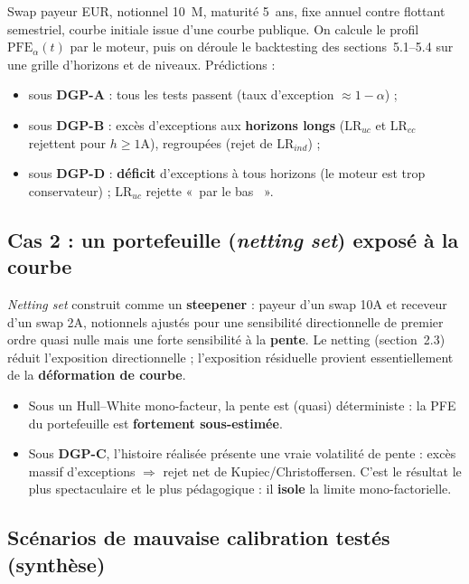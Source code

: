 \documentclass[11pt,a4paper]{article}
\providecommand{\euro}{\texteuro}
\providecommand{\og}{«~}
\providecommand{\fg}{~»}
\newcommand{\PFE}{\mathrm{PFE}}
\newcommand{\LRuc}{\mathrm{LR}_{uc}}
\newcommand{\LRind}{\mathrm{LR}_{ind}}
\newcommand{\LRcc}{\mathrm{LR}_{cc}}
\theoremstyle{remark}
\begin{document}
Swap payeur EUR, notionnel 10~M\euro, maturité 5~ans, fixe annuel contre flottant semestriel, courbe initiale issue d'une courbe publique. On calcule le profil $\PFE_\alpha(t)$ par le moteur, puis on déroule le backtesting des sections~5.1--5.4 sur une grille d'horizons et de niveaux. Prédictions :
\begin{itemize}[nosep]
  \item sous \textbf{DGP-A} : tous les tests passent (taux d'exception $\approx 1-\alpha$) ;
  \item sous \textbf{DGP-B} : excès d'exceptions aux \textbf{horizons longs} ($\LRuc$ et $\LRcc$ rejettent pour $h\ge 1\text{A}$), regroupées (rejet de $\LRind$) ;
  \item sous \textbf{DGP-D} : \textbf{déficit} d'exceptions à tous horizons (le moteur est trop conservateur) ; $\LRuc$ rejette \og par le bas \fg{}.
\end{itemize}

\subsection{Cas 2 : un portefeuille (\emph{netting set}) exposé à la courbe}
\label{sec:portefeuille}

\emph{Netting set} construit comme un \textbf{steepener} : payeur d'un swap 10A et receveur d'un swap 2A, notionnels ajustés pour une sensibilité directionnelle de premier ordre quasi nulle mais une forte sensibilité à la \textbf{pente}. Le netting (section~2.3) réduit l'exposition directionnelle ; l'exposition résiduelle provient essentiellement de la \textbf{déformation de courbe}.
\begin{itemize}[nosep]
  \item Sous un Hull--White mono-facteur, la pente est (quasi) déterministe : la PFE du portefeuille est \textbf{fortement sous-estimée}.
  \item Sous \textbf{DGP-C}, l'histoire réalisée présente une vraie volatilité de pente : excès massif d'exceptions $\Rightarrow$ rejet net de Kupiec/Christoffersen. C'est le résultat le plus spectaculaire et le plus pédagogique : il \textbf{isole} la limite mono-factorielle.
\end{itemize}

\subsection{Scénarios de mauvaise calibration testés (synthèse)}
\end{document}

